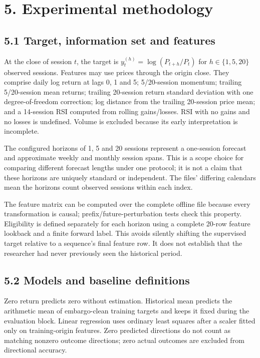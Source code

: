 \documentclass[11pt]{article}
\begin{document}
\section*{5. Experimental methodology}

\subsection*{5.1 Target, information set and features}

At the close of session $t$, the target is $y_t^{(h)}=\log(P_{t+h}/P_t)$ for $h\in\{1,5,20\}$ observed sessions. Features may use prices through the origin close. They comprise daily log return at lags 0, 1 and 5; 5/20-session momentum; trailing 5/20-session mean returns; trailing 20-session return standard deviation with one degree-of-freedom correction; log distance from the trailing 20-session price mean; and a 14-session RSI computed from rolling gains/losses. RSI with no gains and no losses is undefined. Volume is excluded because its early interpretation is incomplete.

The configured horizons of 1, 5 and 20 sessions represent a one-session forecast and approximate weekly and monthly session spans. This is a scope choice for comparing different forecast lengths under one protocol; it is not a claim that these horizons are uniquely standard or independent. The files' differing calendars mean the horizons count observed sessions within each index.

The feature matrix can be computed over the complete offline file because every transformation is causal; prefix/future-perturbation tests check this property. Eligibility is defined separately for each horizon using a complete 20-row feature lookback and a finite forward label. This avoids silently shifting the supervised target relative to a sequence's final feature row. It does not establish that the researcher had never previously seen the historical period.

\subsection*{5.2 Models and baseline definitions}

Zero return predicts zero without estimation. Historical mean predicts the arithmetic mean of embargo-clean training targets and keeps it fixed during the evaluation block. Linear regression uses ordinary least squares after a scaler fitted only on training-origin features. Zero predicted directions do not count as matching nonzero outcome directions; zero actual outcomes are excluded from directional accuracy.
\end{document}
